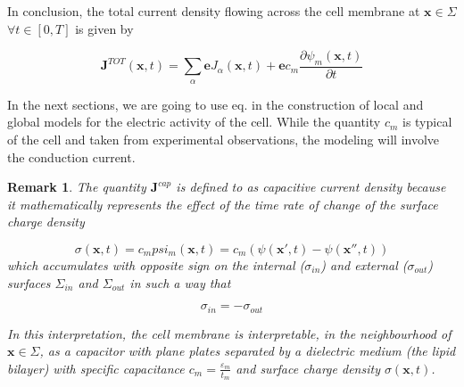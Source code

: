 \documentclass[a4paper]{article}
\newtheorem{remark}{Remark}
\begin{document}
In conclusion, the total current density flowing across the cell membrane at $ \textbf{x} \in \Sigma$ $\forall t \in [0,T]$ is given by

\begin{equation}
\textbf{J}^{TOT}(\textbf{x},t) = \sum_{\alpha} \textbf{e} J_{\alpha}(\textbf{x},t) + \textbf{e} c_m \frac{\partial \psi_m (\textbf{x},t)}{\partial t}
\end{equation}

In the next sections, we are going to use eq. in the construction of local and global models for the electric activity of the cell. While the quantity $c_m$ is typical of the cell and taken from experimental observations, the modeling will involve the conduction current. 

\begin{remark}
	The quantity $\textbf{J}^{cap}$ is defined to as capacitive current density because it mathematically represents the effect of the time rate of change of the surface charge density 
	
	$$ \sigma(\textbf{x},t) = c_m psi_m (\textbf{x},t) = c_m \left(\psi(\textbf{x}',t) - \psi(\textbf{x}'',t) \right)$$
	which accumulates with opposite sign on the internal ($\sigma_{in}$) and external ($\sigma_{out}$) surfaces $\Sigma_{in}$ and $\Sigma_{out}$ in such a way that
	
	$$ \sigma_{in} = -\sigma_{out} $$
	
	In this interpretation, the cell membrane is interpretable, in the neighbourhood of $ \textbf{x} \in \Sigma$, as a capacitor with plane plates separated by a dielectric medium (the lipid bilayer) with specific capacitance $ c_m = \frac{\varepsilon_m}{t_m}$ and surface charge density $\sigma(\textbf{x},t)$.
\end{remark}
\end{document}
